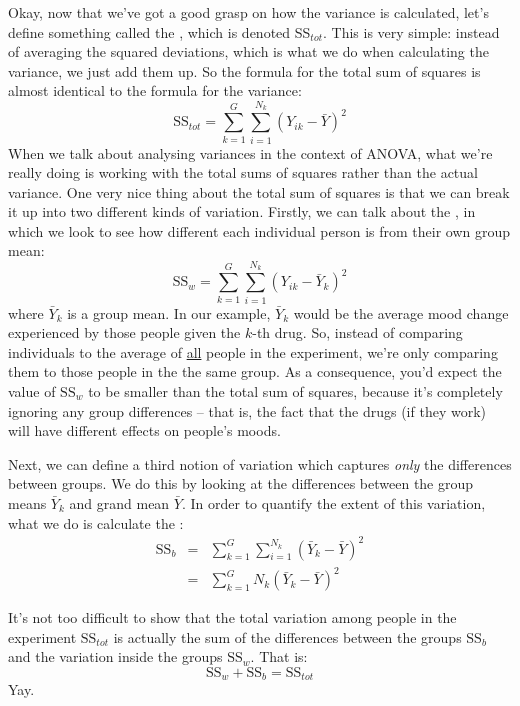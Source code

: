 
Okay, now that we've got a good grasp on how the variance is calculated, let's define something called the , which is denoted SS$_{tot}$. This is very simple: instead of averaging the squared deviations, which is what we do when calculating the variance, we just add them up. So the formula for the total sum of squares is almost identical to the formula for the variance:
$$
\mbox{SS}_{tot} = \sum_{k=1}^G \sum_{i=1}^{N_k} \left(Y_{ik} - \bar{Y} \right)^2
$$ 
When we talk about analysing variances in the context of ANOVA, what we're really doing is working with the total sums of squares rather than the actual variance. One very nice thing about the total sum of squares is that we can break it up into two different kinds of variation. Firstly, we can talk about the , in which we look to see how different each individual person is from their own group mean:
$$
\mbox{SS}_w = \sum_{k=1}^G \sum_{i=1}^{N_k} \left( Y_{ik} - \bar{Y}_k \right)^2
$$
where $\bar{Y}_k$ is a group mean. In our example, $\bar{Y}_k$ would be the average mood change experienced by those people given  the $k$-th drug. So, instead of comparing individuals to the average of \underline{all} people in the experiment, we're only comparing them to those people in the the same group. As a consequence, you'd expect the value of $\mbox{SS}_w$ to be smaller than the total sum of squares, because it's completely ignoring any group differences -- that is, the fact that the drugs (if they work) will have different effects on people's moods.
 
Next, we can define a third notion of variation which captures {\it only} the differences between groups. We do this by looking at the differences between the group means $\bar{Y}_k$ and grand mean $\bar{Y}$. In order to quantify the extent of this variation, what we do is calculate the :
\begin{eqnarray*}
\mbox{SS}_{b} &=& \sum_{k=1}^G \sum_{i=1}^{N_k} \left( \bar{Y}_k - \bar{Y} \right)^2 \\
&=& \sum_{k=1}^G N_k \left( \bar{Y}_k - \bar{Y} \right)^2
\end{eqnarray*}

It's not too difficult to show that the total variation among people in the experiment $\mbox{SS}_{tot}$ is actually the sum of the differences between the groups $\mbox{SS}_b$ and the variation inside the groups $\mbox{SS}_w$. That is:
$$
\mbox{SS}_w  + \mbox{SS}_{b} = \mbox{SS}_{tot}
$$
Yay.

